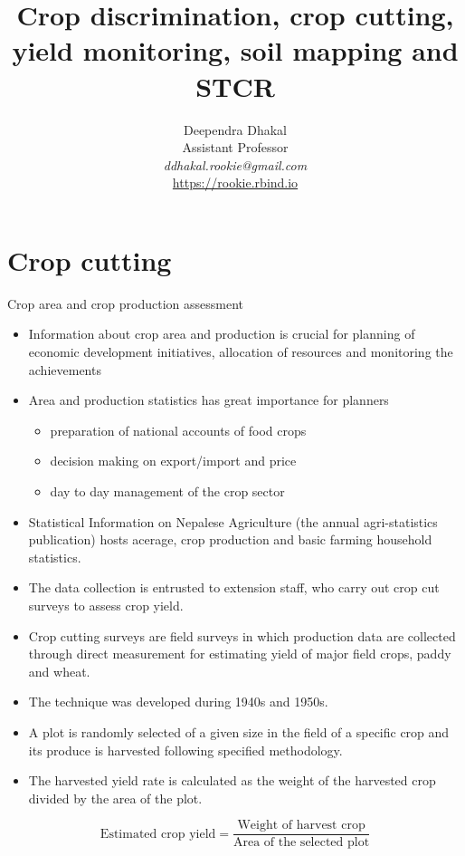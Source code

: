 \documentclass[11pt,dvipsnames,ignorenonframetext,aspectratio=169]{beamer}
\title[]{Crop discrimination, crop cutting, yield monitoring, soil
mapping and STCR}
\author[
        Deependra Dhakal\\
Assistant Professor\\
\textit{ddhakal.rookie@gmail.com}\\
\url{https://rookie.rbind.io}
    ]{Deependra Dhakal\\
Assistant Professor\\
\textit{ddhakal.rookie@gmail.com}\\
\url{https://rookie.rbind.io}}
\date[
      
  ]{
    }
\providecommand{\tightlist}{%
  \setlength{\itemsep}{0pt}\setlength{\parskip}{0pt}}
\begin{document}
  \begin{frame}[plain]
  \titlepage
  \end{frame}



\hypertarget{crop-cutting}{%
\section{Crop cutting}\label{crop-cutting}}

\begin{frame}{Crop area and crop production assessment}
\protect\hypertarget{crop-area-and-crop-production-assessment}{}
\begin{itemize}
\tightlist
\item
  Information about crop area and production is crucial for planning of
  economic development initiatives, allocation of resources and
  monitoring the achievements
\item
  Area and production statistics has great importance for planners

  \begin{itemize}
  \tightlist
  \item
    preparation of national accounts of food crops
  \item
    decision making on export/import and price
  \item
    day to day management of the crop sector
  \end{itemize}
\item
  Statistical Information on Nepalese Agriculture (the annual
  agri-statistics publication) hosts acerage, crop production and basic
  farming household statistics.
\item
  The data collection is entrusted to extension staff, who carry out
  crop cut \alert{surveys} to assess crop yield.
\end{itemize}
\end{frame}

\begin{frame}{}
\protect\hypertarget{section}{}
\begin{itemize}
\tightlist
\item
  Crop cutting surveys are field surveys in which production data are
  collected through direct measurement for estimating yield of major
  field crops, paddy and wheat.
\item
  The technique was developed during 1940s and 1950s.
\item
  A \alert{plot} is \alert{randomly} selected of a given size in the
  field of a specific crop and its produce is harvested following
  specified methodology.
\item
  The harvested yield rate is calculated as the weight of the harvested
  crop divided by the area of the plot.
\end{itemize}

\[
\text{Estimated crop yield} = \frac{\text{Weight of harvest crop}}{\text{Area of the selected plot}}
\]
\end{frame}
\end{document}
